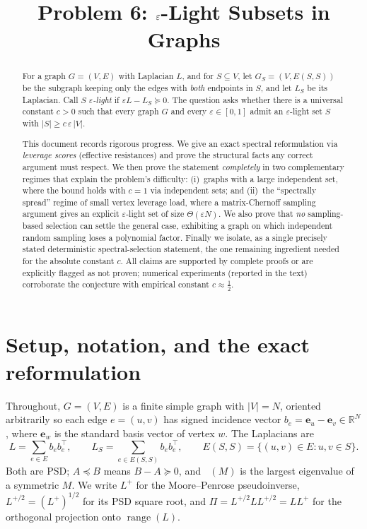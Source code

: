 \documentclass[12pt]{article}
\title{Problem 6: $\eps$-Light Subsets in Graphs}
\author{}
\date{}
\DeclareMathOperator{\range}{range}
\DeclareMathOperator*{\lammax}{\lambda_{\max}}
\newcommand{\bR}{\mathbb{R}}
\newcommand{\eps}{\varepsilon}
\theoremstyle{definition}
\begin{document}
\maketitle

\begin{abstract}
For a graph $G=(V,E)$ with Laplacian $L$, and for $S\subseteq V$, let
$G_S=(V,E(S,S))$ be the subgraph keeping only the edges with \emph{both}
endpoints in $S$, and let $L_S$ be its Laplacian. Call $S$ \emph{$\eps$-light}
if $\eps L-L_S\succeq 0$. The question asks whether there is a universal constant
$c>0$ such that every graph $G$ and every $\eps\in[0,1]$ admit an $\eps$-light
set $S$ with $|S|\ge c\,\eps\,|V|$.

This document records rigorous progress. We give an exact spectral
reformulation via \emph{leverage scores} (effective resistances) and prove the
structural facts any correct argument must respect. We then prove the statement
\emph{completely} in two complementary regimes that explain the problem's
difficulty: (i)~graphs with a large independent set, where the bound holds with
$c=1$ via independent sets; and (ii)~the ``spectrally spread'' regime of small
vertex leverage load, where a matrix-Chernoff sampling argument gives an explicit
$\eps$-light set of size $\Theta(\eps N)$. We also prove that \emph{no}
sampling-based selection can settle the general case, exhibiting a graph on which
independent random sampling loses a polynomial factor. Finally we isolate, as a
single precisely stated deterministic spectral-selection statement, the one
remaining ingredient needed for the absolute constant $c$. All claims are
supported by complete proofs or are explicitly flagged as not proven; numerical
experiments (reported in the text) corroborate the conjecture with empirical
constant $c\approx\tfrac12$.
\end{abstract}

\section{Setup, notation, and the exact reformulation}

Throughout, $G=(V,E)$ is a finite simple graph with $|V|=N$, oriented
arbitrarily so each edge $e=(u,v)$ has signed incidence vector
$b_e=\mathbf e_u-\mathbf e_v\in\bR^{N}$, where $\mathbf e_w$ is the standard
basis vector of vertex $w$. The Laplacians are
\[
  L=\sum_{e\in E}b_eb_e^{\top},
  \qquad
  L_S=\sum_{e\in E(S,S)}b_eb_e^{\top},
  \qquad E(S,S)=\{(u,v)\in E:u,v\in S\}.
\]
Both are PSD; $A\preceq B$ means $B-A\succeq0$, and $\lammax(M)$ is the largest
eigenvalue of a symmetric $M$. We write $L^{+}$ for the Moore--Penrose
pseudoinverse, $L^{+/2}=(L^{+})^{1/2}$ for its PSD square root, and
$\Pi=L^{+/2}LL^{+/2}=LL^{+}$ for the orthogonal projection onto $\range(L)$.
\end{document}
